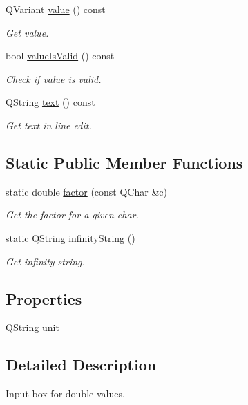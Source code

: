 \begin{DoxyCompactItemize}
Q\-Variant \hyperlink{classmdt_double_edit_a6987992984d3cfab5f96467c2b98e511}{value} () const 
\begin{DoxyCompactList}\small\item\em Get value. \end{DoxyCompactList}\item 
bool \hyperlink{classmdt_double_edit_a530a3b818aba14e34636dc1ad36b9292}{value\-Is\-Valid} () const 
\begin{DoxyCompactList}\small\item\em Check if value is valid. \end{DoxyCompactList}\item 
Q\-String \hyperlink{classmdt_double_edit_a169b321873e50e1e9bf2b15bbf12af78}{text} () const 
\begin{DoxyCompactList}\small\item\em Get text in line edit. \end{DoxyCompactList}\end{DoxyCompactItemize}
\subsection*{Static Public Member Functions}
\begin{DoxyCompactItemize}
\item 
static double \hyperlink{classmdt_double_edit_a8156deaebbd3256e9e7d94ca84e6a03a}{factor} (const Q\-Char \&c)
\begin{DoxyCompactList}\small\item\em Get the factor for a given char. \end{DoxyCompactList}\item 
static Q\-String \hyperlink{classmdt_double_edit_a09e6276d61dd02feea43e795417d8ea9}{infinity\-String} ()
\begin{DoxyCompactList}\small\item\em Get infinity string. \end{DoxyCompactList}\end{DoxyCompactItemize}
\subsection*{Properties}
\begin{DoxyCompactItemize}
\item 
Q\-String \hyperlink{classmdt_double_edit_a163c58477dc88637f999f56714df74ee}{unit}
\end{DoxyCompactItemize}


\subsection{Detailed Description}
Input box for double values. 

